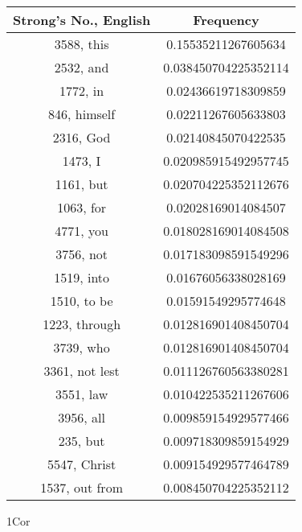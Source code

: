\documentclass[12pt,letterpaper]{article}
\begin{document}
 \begin{longtable}{|c|c|}
\hline
 Strong's No., English & Frequency \\ \hline  
3588, this & 0.15535211267605634\\ \hline 
 2532, and & 0.038450704225352114\\ \hline 
 1772, in & 0.02436619718309859\\ \hline 
 846, himself & 0.02211267605633803\\ \hline 
 2316, God & 0.02140845070422535\\ \hline 
 1473, I & 0.020985915492957745\\ \hline 
 1161, but & 0.020704225352112676\\ \hline 
 1063, for & 0.02028169014084507\\ \hline 
 4771, you & 0.018028169014084508\\ \hline 
 3756, not & 0.017183098591549296\\ \hline 
 1519, into & 0.01676056338028169\\ \hline 
 1510, to be & 0.01591549295774648\\ \hline 
 1223, through & 0.012816901408450704\\ \hline 
 3739, who & 0.012816901408450704\\ \hline 
 3361, not lest & 0.011126760563380281\\ \hline 
 3551, law & 0.010422535211267606\\ \hline 
 3956, all & 0.009859154929577466\\ \hline 
 235, but & 0.009718309859154929\\ \hline 
 5547, Christ & 0.009154929577464789\\ \hline 
 1537, out from & 0.008450704225352112\\ \hline 
\end{longtable} 
 

1Cor
\end{document}
